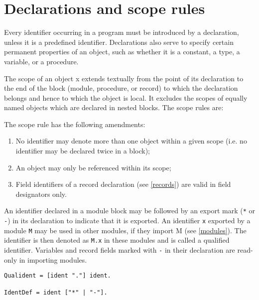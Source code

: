 \documentclass[12pt]{article}
\begin{document}
\section{Declarations and scope rules}
\label{declarations}

Every identifier occurring in a program must be introduced by a declaration, unless it is a predefined identifier. Declarations also serve to specify certain permanent properties of an object, such as whether it is a constant, a type, a variable, or a procedure.

The scope of an object x extends textually from the point of its declaration to the end of the block (module, procedure, or record) to which the declaration belongs and hence to which the object is local. It excludes the scopes of equally named objects which are declared in nested blocks. The scope rules are:

The scope rule has the following amendments:
\begin{enumerate}
    \item No identifier may denote more than one object within a given scope (i.e. no identifier may be declared twice in a block);
    \item An object may only be referenced within its scope;
    \item Field identifiers of a record declaration (see \ref{records}) are valid in field designators only.
\end{enumerate}

An identifier declared in a module block may be followed by an export mark (\lstinline!*! or \lstinline!-!) in its declaration to indicate that it is exported. An identifier \lstinline!x! exported by a module \lstinline!M! may be used in other modules, if they import M (see \ref{modules}). The identifier is then denoted as \lstinline!M.x! in these modules and is called a qualified identifier. Variables and record fields marked with \lstinline!-! in their declaration are read-only in importing modules.

\begin{lstlisting}[style=ebnf]
Qualident = [ident "."] ident. 

IdentDef = ident ["*" | "-"].
\end{lstlisting}
\end{document}
